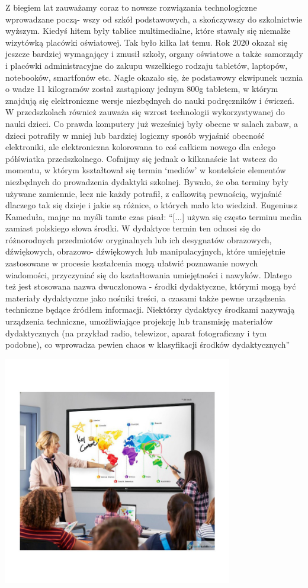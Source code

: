 \documentclass{article}
\begin{document}
Z biegiem lat zauważamy coraz to nowsze rozwiązania technologiczne wprowadzane począ- wszy od szkół podstawowych, a skończywszy do szkolnictwie wyższym. Kiedyś hitem były tablice multimedialne, które stawały się niemalże wizytówką placówki oświatowej. Tak było kilka lat temu. Rok 2020 okazał się jeszcze bardziej wymagający i zmusił szkoły, organy oświatowe a także samorządy i placówki administracyjne do zakupu wszelkiego rodzaju tabletów, laptopów, notebooków, smartfonów etc. Nagle okazało się, że podstawowy ekwipunek ucznia o wadze 11 kilogramów został zastąpiony jednym 800g tabletem, w którym znajdują się elektroniczne wersje niezbędnych do nauki podręczników i ćwiczeń. W przedszkolach również zauważa się wzrost technologii wykorzystywanej do nauki dzieci. Co prawda komputery już wcześniej były obecne w salach zabaw, a dzieci potrafiły w mniej lub bardziej logiczny sposób wyjaśnić obecność elektroniki, ale elektroniczna kolorowana to coś całkiem nowego dla całego półświatka przedszkolnego. Cofnijmy się jednak o kilkanaście lat wstecz do momentu, w którym kształtował się termin ‘mediów’ w kontekście elementów niezbędnych do prowadzenia dydaktyki szkolnej. Bywało, że oba terminy były używane zamiennie, lecz nie każdy potrafił, z całkowitą pewnością, wyjaśnić dlaczego tak się dzieje i jakie są różnice, o których mało kto wiedział. Eugeniusz Kameduła\cite{ref7}, mając na myśli tamte czas pisał: “[...] używa się często terminu media zamiast polskiego słowa środki. W dydaktyce termin ten odnosi się do różnorodnych przedmiotów oryginalnych lub ich desygnatów obrazowych, dźwiękowych, obrazowo- dźwiękowych lub manipulacyjnych, które umiejętnie zastosowane w procesie kształcenia mogą ułatwić poznawanie nowych wiadomości, przyczyniać się do kształtowania umiejętności i nawyków. Dlatego też jest stosowana nazwa dwuczłonowa - środki dydaktyczne, którymi mogą być materiały dydaktyczne jako nośniki treści, a czasami także pewne urządzenia techniczne będące źródłem informacji. Niektórzy dydaktycy środkami nazywają urządzenia techniczne, umożliwiające projekcję lub transmisję materiałów dydaktycznych (na przykład radio, telewizor, aparat fotograficzny i tym podobne), co wprowadza pewien chaos w klasyfikacji środków dydaktycznych”
\begin{center}
	\includegraphics[width=10cm]{modern_school}
\end{center}
\end{document}
